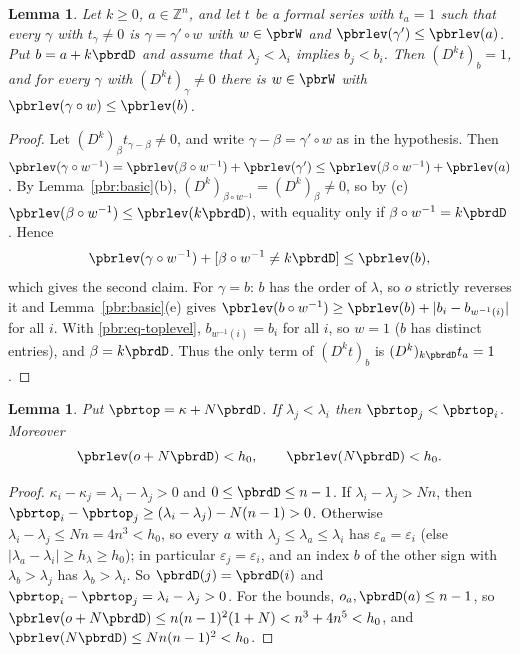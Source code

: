 \documentclass[10pt]{amsart}
\newtheorem{lemma}[theorem]{Lemma}
\theoremstyle{definition}
\theoremstyle{remark}
\newcommand{\Z}{\mathbb Z}
\begin{document}
\begin{lemma}\label{pbr:top}
Let $k\ge0$, $a\in\Z^n$, and let $t$ be a formal series with $t_a=1$ such that every $\gamma$ with
$t_\gamma\ne0$ is $\gamma=\gamma'\circ w$ with $w\in\pbrW$ and $\pbrlev(\gamma')\le\pbrlev(a)$. Put
$b=a+k\pbrdD$ and assume that $\lambda_j<\lambda_i$ implies $b_j<b_i$. Then $(D^kt)_b=1$, and for
every $\gamma$ with $(D^kt)_\gamma\ne0$ there is $w\in\pbrW$ with $\pbrlev(\gamma\circ w)\le
\pbrlev(b)$.
\end{lemma}
\begin{proof}
Let $(D^k)_\beta t_{\gamma-\beta}\ne0$, and write $\gamma-\beta=\gamma'\circ w$ as in the hypothesis.
Then $\pbrlev(\gamma\circ w^{-1})=\pbrlev(\beta\circ w^{-1})+\pbrlev(\gamma')\le\pbrlev(\beta\circ
w^{-1})+\pbrlev(a)$. By Lemma~\ref{pbr:basic}(b), $(D^k)_{\beta\circ w^{-1}}=(D^k)_\beta\ne0$, so by
(c) $\pbrlev(\beta\circ w^{-1})\le\pbrlev(k\pbrdD)$, with equality only if $\beta\circ w^{-1}=
k\pbrdD$. Hence
\begin{equation}\label{pbr:eq-toplevel}
\pbrlev(\gamma\circ w^{-1})+[\beta\circ w^{-1}\ne k\pbrdD]\le\pbrlev(b),
\end{equation}
which gives the second claim. For $\gamma=b$: $b$ has the order of $\lambda$, so $o$ strictly
reverses it and Lemma~\ref{pbr:basic}(e) gives $\pbrlev(b\circ w^{-1})\ge\pbrlev(b)+|b_i-b_{w^{-1}
(i)}|$ for all $i$. With \eqref{pbr:eq-toplevel}, $b_{w^{-1}(i)}=b_i$ for all $i$, so $w=1$ ($b$ has
distinct entries), and $\beta=k\pbrdD$. Thus the only term of $(D^kt)_b$ is $(D^k)_{k\pbrdD}
t_a=1$.
\end{proof}

\begin{lemma}\label{pbr:tau}
Put $\pbrtop=\kappa+N\pbrdD$. If $\lambda_j<\lambda_i$ then $\pbrtop_j<\pbrtop_i$. Moreover
\[
\pbrlev(o+N\pbrdD)<h_0,\qquad \pbrlev(N\pbrdD)<h_0 .
\]
\end{lemma}
\begin{proof}
$\kappa_i-\kappa_j=\lambda_i-\lambda_j>0$ and $0\le\pbrdD\le n-1$. If $\lambda_i-\lambda_j>Nn$, then
$\pbrtop_i-\pbrtop_j\ge(\lambda_i-\lambda_j)-N(n-1)>0$. Otherwise $\lambda_i-\lambda_j\le Nn=4n^3<h_0$,
so every $a$ with $\lambda_j\le\lambda_a\le\lambda_i$ has $\varepsilon_a=\varepsilon_i$ (else
$|\lambda_a-\lambda_i|\ge h_\lambda\ge h_0$); in particular $\varepsilon_j=\varepsilon_i$, and an index $b$
of the other sign with $\lambda_b>\lambda_j$ has $\lambda_b>\lambda_i$. So $\pbrdD(j)=\pbrdD(i)$ and
$\pbrtop_i-\pbrtop_j=\lambda_i-\lambda_j>0$. For the bounds, $o_a,\pbrdD(a)\le n-1$, so
$\pbrlev(o+N\pbrdD)\le n(n-1)^2(1+N)<n^3+4n^5<h_0$, and $\pbrlev(N\pbrdD)\le Nn(n-1)^2<h_0$.
\end{proof}
\end{document}

